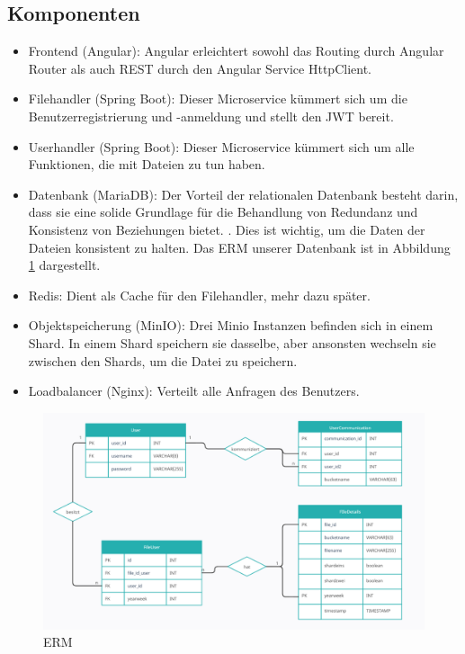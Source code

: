 \documentclass[12pt]{report}
\begin{document}
		\subsection{Komponenten}
			\begin{itemize}
				\item Frontend (Angular): Angular erleichtert sowohl das Routing durch Angular Router als auch REST durch den Angular Service HttpClient.
				\item Filehandler (Spring Boot): Dieser Microservice kümmert sich um die Benutzerregistrierung und -anmeldung und stellt den JWT bereit.
				\item Userhandler (Spring Boot): Dieser Microservice kümmert sich um alle Funktionen, die mit Dateien zu tun haben.
				\item Datenbank (MariaDB):  Der Vorteil der relationalen Datenbank besteht darin, dass sie eine solide Grundlage für die Behandlung von Redundanz und Konsistenz von Beziehungen bietet. \cite{codd1970relational}. Dies ist wichtig, um die Daten der Dateien konsistent zu halten. Das ERM unserer Datenbank ist in Abbildung 	\ref{fig:erm} dargestellt.
				\item Redis: Dient als Cache für den Filehandler, mehr dazu später.
				\item Objektspeicherung (MinIO): Drei Minio Instanzen befinden sich in einem Shard. In einem Shard speichern sie dasselbe, aber ansonsten wechseln sie zwischen den Shards, um die Datei zu speichern.
				\item Loadbalancer (Nginx): Verteilt alle Anfragen des Benutzers.
			\end{itemize}
			
			\begin{figure}[h]
				\centering
				\includegraphics[width=\linewidth]{erm}
				\caption{ERM}
				\label{fig:erm}
			\end{figure}
			
\end{document}
